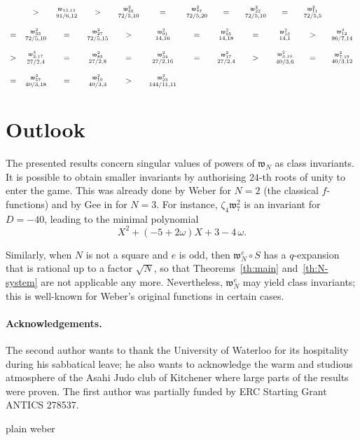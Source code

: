 \documentclass[12pt,twoside,leqno]{article}
\numberwithin{equation}{section}
\newcommand{\w}{\mathfrak w}
\begin{document}
\begin {table}[hbt]
$$\begin{array}{cccccccccccc}
&>& \entree{\w_{13, 13}}{91/6, 12}
&>& \entree{\w_{55}^{2}}{72/5, 10}
&=& \entree{\w_{77}^{2}}{72/5, 20}
&=& \entree{\w_{22}^{2}}{72/5, 10}
&=& \entree{\w_{11}^{2}}{72/5, 5}
\\
\\
=& \entree{\w_{33}^{2}}{72/5, 10}
&=& \entree{\w_{27}^{2}}{72/5, 15}
&>& \entree{\w_{91}^{2}}{14, 16}
&=& \entree{\w_{65}^{2}}{14, 18}
&=& \entree{\w_{13}^{2}}{14, 1}
&>& \entree{\w_{12}^{3}}{96/7, 14}
\\
\\
>& \entree{\w_{2, 17}^{3}}{27/2, 4}
&=& \entree{\w_{85}^{2}}{27/2, 8}
&=& \entree{\w_{34}^{2}}{27/2, 16}
&=& \entree{\w_{17}^{2}}{27/2, 4}
&>& \entree{\w_{3, 19}^{2}}{40/3, 6}
&=& \entree{\w_{7\cdot 19}^{2}}{40/3, 12}
\\
\\
=& \entree{\w_{57}^{2}}{40/3, 18}
&=& \entree{\w_{19}^{2}}{40/3, 3}
&>& \entree{\w_{23}^{2}}{144/11, 11}
\end{array}
$$
\end {table}


\section{Outlook}

The presented results concern singular values of powers of $\w_N$
as class invariants.
It is possible to obtain smaller invariants by
authorising $24$-th roots of unity to enter the game. This was already
done by Weber for $N=2$ (the classical $f$-functions) and
by Gee in \cite{Gee01} for $N=3$.
For instance, $\zeta_4\w_7^2$ is
an invariant for $D=-40$, leading to the minimal polynomial
$${X}^{2}+ \left( -5+2\omega \right) X+3-4\,\omega.$$

Similarly, when $N$ is not a square and $e$ is odd, then
$\w_N^e \circ S$ has a $q$-expansion that is rational up to a
factor $\sqrt N$, so that Theorems~\ref {th:main} and~\ref {th:N-system}
are not applicable any more. Nevertheless, $\w_N^e$ may yield class
invariants; this is well-known for Weber's original functions in certain
cases.



\paragraph {Acknowledgements.}
The second author wants to thank the University
of Waterloo for its hospitality during his sabbatical leave; he also
wants to acknowledge the warm and studious atmosphere of the Asahi
Judo club of Kitchener where large parts of the results were proven.
The first author was partially funded by ERC Starting Grant ANTICS 278537.

 {plain}
 {weber}
\end{document}
